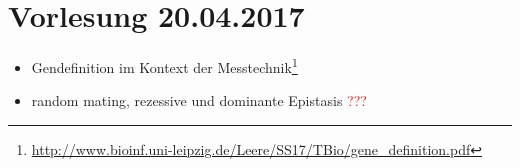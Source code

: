 \section{Vorlesung 20.04.2017}

\begin{itemize}
	\item Gendefinition im Kontext der Messtechnik\footnote{\url{http://www.bioinf.uni-leipzig.de/Leere/SS17/TBio/gene_definition.pdf}}
		\item random mating, rezessive und dominante Epistasis \textcolor{red}{???}
\end{itemize}